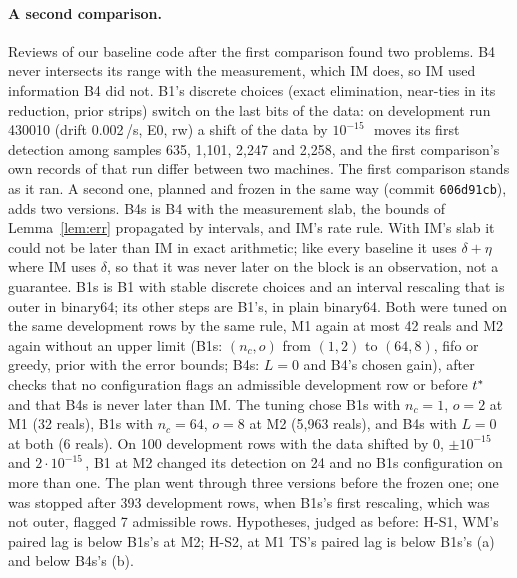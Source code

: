 \paragraph{A second comparison.} Reviews of our baseline code after the first comparison found two problems. B4 never
intersects its range with the measurement, which IM does, so IM used information B4 did not. B1's discrete choices
(exact elimination, near-ties in its reduction, prior strips) switch on the last bits of the data: on development run
430010 (drift 0.002\,\degC/s, E0, rw) a shift of the data by $10^{-15}$\,\degC\ moves its first detection among
samples 635, 1,101, 2,247 and 2,258, and the first comparison's own records of that run differ between two machines.
The first comparison stands as it ran. A second one, planned and frozen in the same way (commit \texttt{606d91cb}),
adds two versions. B4s is B4 with the measurement slab, the bounds of Lemma~\ref{lem:err} propagated by intervals, and
IM's rate rule. With IM's slab it could not be later than IM in exact arithmetic; like every baseline it uses
$\delta+\eta$ where IM uses $\delta$, so that it was never later on the block is an observation, not a guarantee. B1s is B1 with stable discrete choices and an interval
rescaling that is outer in binary64; its other steps are B1's, in plain binary64. Both were tuned on the same
development rows by the same rule, M1 again at most 42 reals and M2 again without an upper limit (B1s: $(n_c, o)$ from
$(1, 2)$ to $(64, 8)$, fifo or greedy, prior with the error bounds; B4s: $L = 0$ and B4's chosen gain), after checks
that no configuration flags an admissible development row or before $t^{\ast}$ and that B4s is never later than IM.
The tuning chose B1s with $n_c = 1$, $o = 2$ at M1 (32 reals), B1s with $n_c = 64$, $o = 8$ at M2 (5,963 reals), and
B4s with $L = 0$ at both (6 reals). On 100 development rows with the data shifted by 0, $\pm10^{-15}$ and
$2\cdot10^{-15}$\,\degC, B1 at M2 changed its detection on 24 and no B1s configuration on more than one. The plan went
through three versions before the frozen one; one was stopped after 393 development rows, when B1s's first
rescaling, which was not outer, flagged 7 admissible rows. Hypotheses, judged as before: H-S1, WM's paired lag is
below B1s's at M2; H-S2, at M1 TS's paired lag is below B1s's (a) and below B4s's (b).

